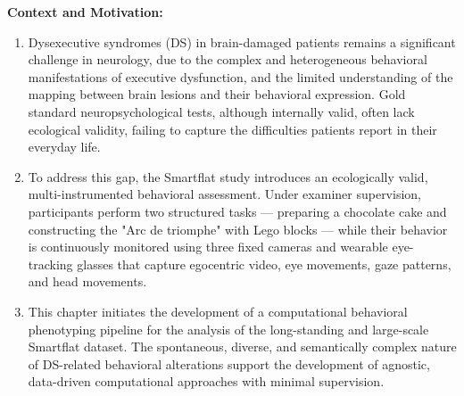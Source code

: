 \begin{chapterabstract}
    \textbf{Context and Motivation:}
    \begin{enumerate}
        \item Dysexecutive syndromes (DS) in brain-damaged patients remains a significant challenge in neurology, due to the complex and heterogeneous behavioral manifestations of executive dysfunction, and the limited understanding of the mapping between brain lesions and their behavioral expression. Gold standard neuropsychological tests, although internally valid, often lack ecological validity, failing to capture the difficulties patients report in their everyday life. 

        \item To address this gap, the Smartflat study introduces an ecologically valid, multi-instrumented behavioral assessment. Under examiner supervision, participants perform two structured tasks — preparing a chocolate cake and constructing the "Arc de triomphe" with Lego blocks — while their behavior is continuously monitored using three fixed cameras and wearable eye-tracking glasses that capture egocentric video, eye movements, gaze patterns, and head movements.

        \item This chapter initiates the development of a computational behavioral phenotyping pipeline for the analysis of the long-standing and large-scale Smartflat dataset. The spontaneous, diverse, and semantically complex nature of DS-related behavioral alterations support the development of agnostic, data-driven computational approaches with minimal supervision.




\end{enumerate}
\end{chapterabstract}

